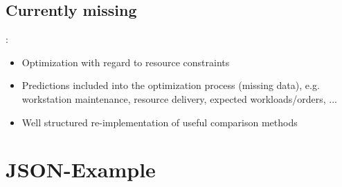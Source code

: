\documentclass[a4paper,12pt,twoside]{scrreprt}
\begin{document}
\begin{flushleft}
\subsection{Currently missing}:

\begin{itemize}
	\item Optimization with regard to resource constraints
	\item Predictions included into the optimization process (missing data), e.g. workstation maintenance, resource delivery, expected workloads/orders, ...
	\item Well structured re-implementation of useful comparison methods
\end{itemize}

\end{flushleft}
\section{JSON-Example}
\label{json_example}
\end{document}
